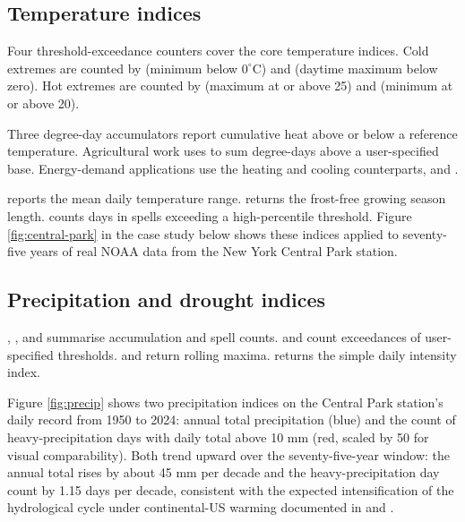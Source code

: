 \subsection{Temperature indices}\label{temperature-indices}

Four threshold-exceedance counters cover the core temperature indices.
Cold extremes are counted by  (minimum below
\(0^\circ\)C) and  (daytime maximum below zero).
Hot extremes are counted by  (maximum at or
above 25) and  (minimum at or above 20).

Three degree-day accumulators report cumulative heat above or below a
reference temperature. Agricultural work uses
 to sum degree-days above a
user-specified base. Energy-demand applications use the heating and
cooling counterparts,  and
.

 reports the mean daily temperature range.
 returns the frost-free growing season
length.  counts days in spells exceeding a
high-percentile threshold. Figure \ref{fig:central-park} in the case
study below shows these indices applied to seventy-five years of real
NOAA data from the New York Central Park station.

\subsection{Precipitation and drought
indices}\label{precipitation-and-drought-indices}

, , and
 summarise accumulation and spell counts.
 and  count
exceedances of user-specified thresholds. 
and  return rolling maxima.
 returns the simple daily intensity index.

Figure \ref{fig:precip} shows two precipitation indices on the Central
Park station's daily record from 1950 to 2024: annual total
precipitation (blue) and the count of heavy-precipitation days with
daily total above 10 mm (red, scaled by 50 for visual comparability).
Both trend upward over the seventy-five-year window: the annual total
rises by about 45 mm per decade and the heavy-precipitation day count by
1.15 days per decade, consistent with the expected intensification of
the hydrological cycle under continental-US warming documented in
\citet{alexander2006global} and \citet{donat2013hadex2}.

